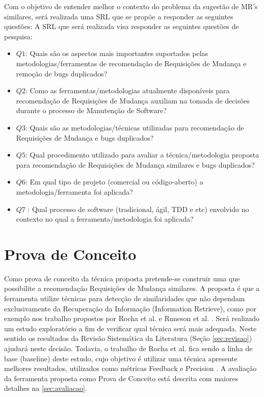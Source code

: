 \documentclass[msc,proposal,hidelot,hideabstract]{ppgccufmg} %
\begin{document}
Com o objetivo de entender melhor o contexto do problema da sugestão de MR's
similares, será realizada uma SRL que se propõe a responder as seguintes
questões:  A SRL que será realizada visa responder as seguintes questões de
pesquisa:

\begin{itemize}
  \item \textbf{$Q1$}: Quais são os aspectos mais importantes suportados pelas
    metodologias/ferramentas de recomendação de Requisições de Mudança e
    remoção de bugs duplicados?
  \item \textbf{$Q2$}: Como as ferramentas/metodologias atualmente disponíveis
    para recomendação de Requisições de Mudança auxiliam na tomada de decisões
    durante o processo de Manutenção de Software?
  \item \textbf{$Q3$}: Quais são as metodologias/técnicas utilizadas para
    recomendação de Requisições de Mudança e bugs duplicados?
  \item \textbf{$Q5$}: Qual procedimento utilizado para avaliar a
    técnica/metodologia proposta para recomendação de Requisições de Mudança similares e
    bugs duplicados?
  \item \textbf{$Q6$}: Em qual tipo de projeto (comercial ou código-aberto) a
    metodologia/ferramenta foi aplicada?
  \item \textbf{$Q7$} : Qual processo de software (tradicional, ágil, TDD e
    etc) envolvido no contexto no qual a ferramenta/metodologia foi aplicada?
\end{itemize}



\section{Prova de Conceito}
\label{sec:prova-conceito}

Como prova de conceito da técnica proposta pretende-se construir uma que
possibilite a recomendação Requisições de Mudança similares. A proposta é que a
ferramenta utilize técnicas para detecção de similaridades que não dependam
exclusivamente da Recuperação da Informação (Information Retrieve), como por
exemplo nos trabalho propostos por  Rocha et al. \cite{101186} e Runeson et
al. \cite{Runeson:2007:DDD:1248820.1248882}. Será realizado um estudo
exploratório a fim de verificar qual técnica será mais adequada. Neste sentido
os resultados da Revisão Sistemática da Literatura (Seção \ref{sec:revisao})
ajudará neste decisão. Todavia, o trabalho de  Rocha et al. \cite{101186} fica
sendo a linha de base (baseline) deste estudo, cujo objetivo é utilizar uma
técnica apresente melhores resultados, utilizados como métricas Feedback e
Precision \cite{zimmermann2005mining}. A avaliação da ferramenta proposta como
Prova de Conceito está descrita com maiores detalhes na \ref{sec:avaliacao}.
\end{document}
